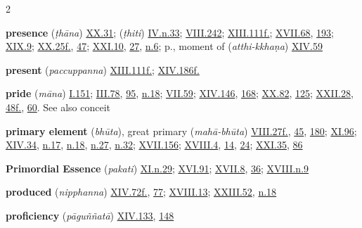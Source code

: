 \begin{multicols}{2}
\begin{vismHanging}
\par\textbf{presence} (\emph{ṭhāna}) \hyperlink{XX.31}{XX.31}{}; (\emph{ṭhiti}) \hyperlink{IV.n33}{IV.n.33}{}; \hyperlink{VIII.242}{VIII.242}{}; \hyperlink{XIII.111}{XIII.111f.}{}; \hyperlink{XVII.68}{XVII.68}{}, \hyperlink{XVII.193}{193}{}; \hyperlink{XIX.9}{XIX.9}{}; \hyperlink{XX.25}{XX.25f.}{}, \hyperlink{XX.47}{47}{}; \hyperlink{XXI.10}{XXI.10}{}, \hyperlink{XXI.27}{27}{}, \hyperlink{XXI.n6}{n.6}{}; p., moment of (\emph{atthi-kkhaṇa}) \hyperlink{XIV.59}{XIV.59}{}
\par\textbf{present} (\emph{paccuppanna}) \hyperlink{XIII.111}{XIII.111f.}{}; \hyperlink{XIV.186}{XIV.186f.}{}
\par\textbf{pride} (\emph{māna}) \hyperlink{I.151}{I.151}{}; \hyperlink{III.78}{III.78}{}, \hyperlink{III.95}{95}{}, \hyperlink{III.n18}{n.18}{}; \hyperlink{VII.59}{VII.59}{}; \hyperlink{XIV.146}{XIV.146}{}, \hyperlink{XIV.168}{168}{}; \hyperlink{XX.82}{XX.82}{}, \hyperlink{XX.125}{125}{}; \hyperlink{XXII.28}{XXII.28}{}, \hyperlink{XXII.48}{48f.}{}, \hyperlink{XXII.60}{60}{}. See also conceit 
\par\textbf{primary element} (\emph{bhūta}), great primary (\emph{mahā-bhūta}) \hyperlink{VIII.27}{VIII.27f.}{}, \hyperlink{VIII.45}{45}{}, \hyperlink{VIII.180}{180}{}; \hyperlink{XI.96}{XI.96}{}; \hyperlink{XIV.34}{XIV.34}{}, \hyperlink{XIV.n17}{n.17}{}, \hyperlink{XIV.n18}{n.18}{}, \hyperlink{XIV.n27}{n.27}{}, \hyperlink{XIV.n32}{n.32}{}; \hyperlink{XVII.156}{XVII.156}{}; \hyperlink{XVIII.4}{XVIII.4}{}, \hyperlink{XVIII.14}{14}{}, \hyperlink{XVIII.24}{24}{}; \hyperlink{XXI.35}{XXI.35}{}, \hyperlink{XXI.86}{86}{}
\par\textbf{Primordial Essence} (\emph{pakati}) \hyperlink{XI.n29}{XI.n.29}{}; \hyperlink{XVI.91}{XVI.91}{}; \hyperlink{XVII.8}{XVII.8}{}, \hyperlink{XVII.36}{36}{}; \hyperlink{XVIII.n9}{XVIII.n.9}{}
\par\textbf{produced} (\emph{nipphanna}) \hyperlink{XIV.72}{XIV.72f.}{}, \hyperlink{XIV.77}{77}{}; \hyperlink{XVIII.13}{XVIII.13}{}; \hyperlink{XXIII.52}{XXIII.52}{}, \hyperlink{XXIII.n18}{n.18}{}
\par\textbf{proficiency} (\emph{pāguññatā}) \hyperlink{XIV.133}{XIV.133}{}, \hyperlink{XIV.148}{148}{}

\end{vismHanging}
\end{multicols}
